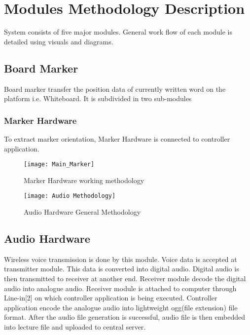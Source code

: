
\section{Modules Methodology Description}
System consists of five major modules. General work flow of each module is detailed using visuals and diagrams.
\subsection{Board Marker}
Board marker transfer the position data of currently written word on the platform i.e. Whiteboard. It is subdivided in two sub-modules


\subsubsection{Marker Hardware}
To extract marker orientation, Marker Hardware is connected to controller application.

\begin{figure}[h]
  \centering
  \texttt{[image: Main\_Marker]}
  \caption{Marker Hardware working methodology}
\end{figure}

\begin{figure}[h]
  \centering
  \texttt{[image: Audio Methodology]}
  \caption{Audio Hardware General Methodology}
\end{figure}

\subsection{Audio Hardware}
Wireless voice transmission is done by this module. Voice data is accepted at transmitter module. This data is converted into digital audio. Digital audio is then transmitted to receiver at another end. Receiver module decode the digital audio into analogue audio. Receiver module is attached to computer through Line-in[2] on which controller application is being executed. Controller application encode the analogue audio into lightweight ogg(file extension) file format. After the audio file generation is successful, audio file is then embedded into lecture file and uploaded to central server.



